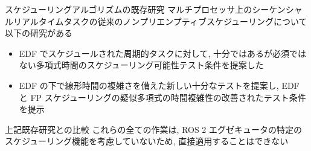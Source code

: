 \begin{frame}{スケジューリングアルゴリズムの既存研究}
    マルチプロセッサ上のシーケンシャルリアルタイムタスクの従来のノンプリエンプティブスケジューリングについて以下の研究がある
    \begin{itemize}
        \item EDF でスケジュールされた周期的タスクに対して, 十分ではあるが必須ではない多項式時間のスケジューリング可能性テスト条件を提案した \cite{baruah2006non}
        \item EDF の下で線形時間の複雑さを備えた新しい十分なテストを提案し, EDF と FP スケジューリングの疑似多項式の時間複雑性の改善されたテスト条件を提示 \cite{guan2008new}
    \end{itemize}
\end{frame}

\begin{frame}{上記既存研究との比較}
    これらの全ての作業は, ROS 2 エグゼキュータの特定のスケジューリング機能を考慮していないため, 直接適用することはできない
\end{frame}
